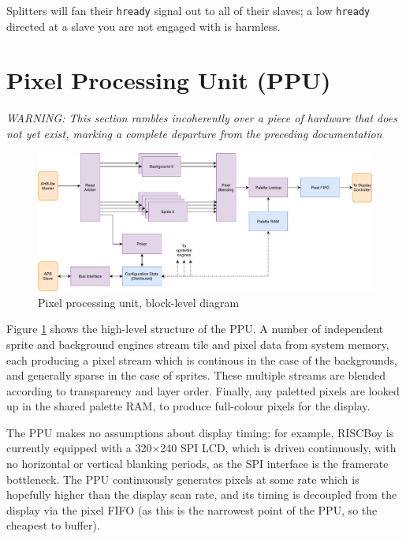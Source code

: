 \documentclass[notitlepage]{article}
\begin{document}
Splitters will fan their \texttt{hready} signal out to all of their slaves; a low \texttt{hready} directed at a slave you are not engaged with is harmless.



\section{Pixel Processing Unit (PPU)}

\textit{WARNING: This section rambles incoherently over a piece of hardware that does not yet exist, marking a complete departure from the preceding documentation}

\begin{figure}[!htb]
\centering
\caption{Pixel processing unit, block-level diagram}
\label{diagram:ppu_block}
\includegraphics[width=\textwidth]{diagrams/ppu_block.pdf}
\end{figure}

Figure \ref{diagram:ppu_block} shows the high-level structure of the PPU. A number of independent sprite and background engines stream tile and pixel data from system memory, each producing a pixel stream which is continous in the case of the backgrounds, and generally sparse in the case of sprites. These multiple streams are blended according to transparency and layer order. Finally, any paletted pixels are looked up in the shared palette RAM, to produce full-colour pixels for the display.

The PPU makes no assumptions about display timing: for example, RISCBoy is currently equipped with a 320$\times$240 SPI LCD, which is driven continuously, with no horizontal or vertical blanking periods, as the SPI interface is the framerate bottleneck. The PPU continuously generates pixels at some rate which is hopefully higher than the display scan rate, and its timing is decoupled from the display via the pixel FIFO (as this is the narrowest point of the PPU, so the cheapest to buffer).
\end{document}
